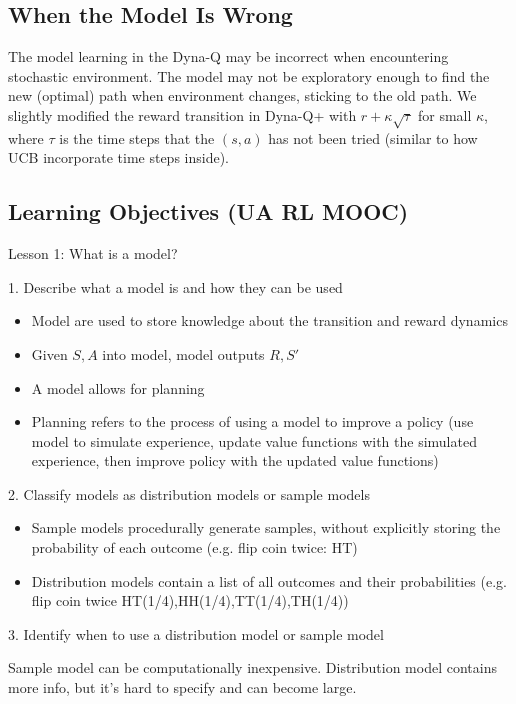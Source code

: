 \documentclass[sutton_barto_notes.tex]{subfiles}
\begin{document}
\subsection{When the Model Is Wrong}

The model learning in the Dyna-Q may be incorrect when encountering stochastic environment. The model may not be exploratory enough to find the new (optimal) path when environment changes, sticking to the old path. We slightly modified the reward transition in Dyna-Q+ with $r+\kappa\sqrt{\tau}$ for small $\kappa$, where $\tau$ is the time steps that the $(s,a)$ has not been tried (similar to how UCB incorporate time steps inside).

\subsection{Learning Objectives (UA RL MOOC)}


Lesson 1: What is a model? 

1. Describe what a model is and how they can be used

\begin{itemize}
\item Model are used to store knowledge about the transition and reward dynamics
\item Given $S,A$ into model, model outputs $R, S'$
\item A model allows for planning
\item Planning refers to the process of using a model to improve a policy (use model to simulate experience, update value functions with the simulated experience, then improve policy with the updated value functions)
\end{itemize}

2. Classify models as distribution models or sample models 

\begin{itemize}
\item Sample models procedurally generate samples, without explicitly storing the probability of each outcome (e.g. flip coin twice: HT)
\item Distribution models contain a list of all outcomes and their probabilities (e.g. flip coin twice HT(1/4),HH(1/4),TT(1/4),TH(1/4))
\end{itemize}

3. Identify when to use a distribution model or sample model 

Sample model can be computationally inexpensive. Distribution model contains more info, but it's hard to specify and can become large.
\end{document}
